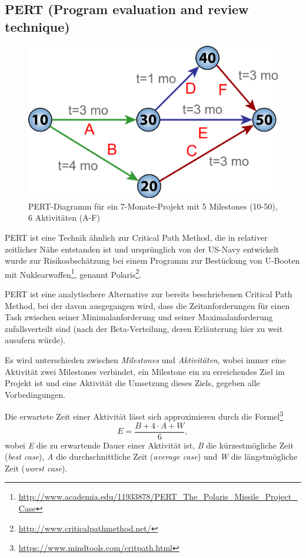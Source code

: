 	\subsection{PERT (Program evaluation and review technique)}
		\label{ssec:pert}
		\begin{figure}[ht]
			\begin{center}
				\includegraphics[scale=.2]{images/pert.png}
			\end{center}
			\caption{PERT-Diagramm für ein 7-Monate-Projekt mit 5 Milestones (10-50), 6 Aktivitäten (A-F)}
			\label{img:pert}
		\end{figure}
		PERT ist eine Technik ähnlich zur Critical Path Method, die in relativer zeitlicher Nähe entstanden ist und ursprünglich von der US-Navy entwickelt wurde zur Risikoabschätzung bei einem Programm zur Bestückung von U-Booten mit Nuklearwaffen\footnote{
			\url{http://www.academia.edu/11933878/PERT_The_Polaris_Missile_Project_Case}
		}, genannt Polaris\footnote{
			\url{http://www.criticalpathmethod.net/}
		}.
		
		PERT ist eine analytischere Alternative zur bereits beschriebenen Critical Path Method, bei der davon ausgegangen wird, dass die Zeitanforderungen für einen Task zwischen seiner Minimalanforderung und seiner Maximalanforderung zufallsverteilt sind (nach der Beta-Verteilung, deren Erläuterung hier zu weit ausufern würde).
		
		Es wird unterschieden zwischen \textit{Milestones} und \textit{Aktivitäten}, wobei immer eine Aktivität zwei Milestones verbindet, ein Milestone ein zu erreichendes Ziel im Projekt ist und eine Aktivität die Umsetzung dieses Ziels, gegeben alle Vorbedingungen.
		
		Die erwartete Zeit einer Aktivität lässt sich approximieren durch die Formel\footnote{
			\url{https://www.mindtools.com/critpath.html}
		}
		\begin{equation}
			E = \frac{B + 4 \cdot A + W}{6},
		\end{equation}
		wobei \textit{E} die zu erwartende Dauer einer Aktivität ist, \textit{B} die kürzestmögliche Zeit (\textit{best case}), \textit{A} die durchschnittliche Zeit (\textit{average case}) und \textit{W} die längstmögliche Zeit (\textit{worst case}).
		
